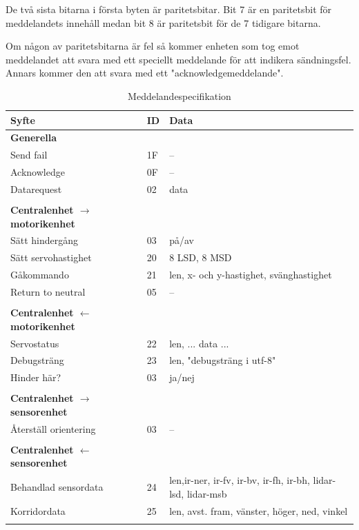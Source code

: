 \documentclass[a4paper,titlepage,12pt]{article}
\begin{document}
	De två sista bitarna i första byten är paritetsbitar. Bit 7 är en  paritetsbit
	för meddelandets innehåll medan bit 8 är paritetsbit för de 7 tidigare bitarna.

	Om någon av paritetsbitarna är fel så kommer enheten som tog emot meddelandet att svara
	med ett speciellt meddelande för att indikera sändningsfel. Annars kommer den 
	att svara med ett "acknowledgemeddelande".

    \newpage
	\begin{longtable}[c]{ l l l }
		\textbf{Syfte} & \textbf{ID} & \textbf{Data} \\ \midrule
		\textbf{Generella} \\ \midrule
		Send fail & 1F & -- \\ \midrule
		Acknowledge & 0F & -- \\ \midrule
		Datarequest & 02 & data \\ \midrule
		\\
		\textbf{Centralenhet $ \to $ motorikenhet}\\ \midrule
		Sätt hindergång & 03 & på/av \\ \midrule
		Sätt servohastighet & 20 & 8 LSD, 8 MSD \\ \midrule
		Gåkommando &  21 & len, x- och y-hastighet, svänghastighet \\ \midrule
		Return to neutral & 05 & -- \\ \midrule
		\\
		\textbf{Centralenhet $ \gets $ motorikenhet}\\ \midrule
		Servostatus & 22 & len, ... data ... \\ \midrule
		Debugsträng & 23 & len, "debugsträng i utf-8" \\ \midrule
		Hinder här? & 03 & ja/nej \\ \midrule
		\\
		\textbf{Centralenhet $\to$ sensorenhet} \\ \midrule
		Återställ orientering & 03 & -- \\ \midrule
		\\
		\textbf{Centralenhet $ \gets $ sensorenhet}\\ \midrule
		Behandlad sensordata & 24 & len,ir-ner, ir-fv, ir-bv, ir-fh, ir-bh,
        lidar-lsd, lidar-msb \\ \midrule
		Korridordata		 & 25 & len, avst. fram, vänster, höger, ned, vinkel \\

		\caption{Meddelandespecifikation \label{table:messages}}
	\end{longtable}
\end{document}
